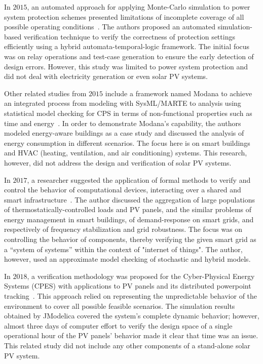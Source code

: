 In $2015$, an automated approach for applying Monte-Carlo simulation to power system protection schemes presented limitations of incomplete coverage of all possible operating conditions~\cite{Sengupta2015}. The authors proposed an automated simulation-based verification technique to verify the correctness of protection settings efficiently using a hybrid automata-temporal-logic framework. The initial focus was on relay operations and test-case generation to ensure the early detection of design errors. However, this study was limited to power system protection and did not deal with electricity generation or even solar PV systems.

Other related studies from $2015$ include a framework named Modana to achieve an integrated process from modeling with SysML/MARTE to analysis using statistical model checking for CPS in terms of non-functional properties such as time and energy~\cite{Cheng2015}. In order to demonstrate Modana's capability, the authors modeled energy-aware buildings as a case study and discussed the analysis of energy consumption in different scenarios. The focus here is on smart buildings and HVAC (heating, ventilation, and air conditioning) systems. This research, however, did not address the design and verification of solar PV systems. 
 
In $2017$, a researcher suggested the application of formal methods to verify and control the behavior of computational devices, interacting over a shared and smart infrastructure~\cite{Abate2017}. The author discussed the aggregation of large populations of thermostatically-controlled loads and PV panels, and the similar problems of energy management in smart buildings, of demand-response on smart grids, and respectively of frequency stabilization and grid robustness. The focus was on controlling the behavior of components, thereby verifying the given smart grid as a ``system of systems'' within the context of "internet of things". The author, however, used an approximate model checking of stochastic and hybrid models.

In $2018$, a verification methodology was proposed for the Cyber-Physical Energy Systems (CPES) with applications to PV panels and its distributed powerpoint tracking~\cite{Driouich2018}. This approach relied on representing the unpredictable behavior of the environment to cover all possible feasible scenarios. The simulation results obtained by JModelica covered the system's complete dynamic behavior; however, almost three days of computer effort to verify the design space of a single operational hour of the PV panels’ behavior made it clear that time was an issue. This related study did not include any  other components of a stand-alone solar PV system. %

